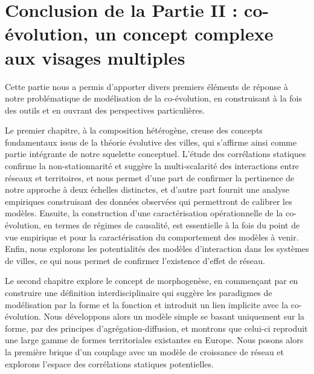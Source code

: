 



\chapter*{Conclusion de la Partie II : co-évolution, un concept complexe aux visages multiples}








Cette partie nous a permis d'apporter divers premiers éléments de réponse à notre problématique de modélisation de la co-évolution, en construisant à la fois des outils et en ouvrant des perspectives particulières. 


Le premier chapitre, à la composition hétérogène, creuse des concepts fondamentaux issus de la théorie évolutive des villes, qui s'affirme ainsi comme partie intégrante de notre squelette conceptuel. L'étude des corrélations statiques confirme la non-stationnarité et suggère la multi-scalarité des interactions entre réseaux et territoires, et nous permet d'une part de confirmer la pertinence de notre approche à deux échelles distinctes, et d'autre part fournit une analyse empiriques construisant des données observées qui permettront de calibrer les modèles. Ensuite, la construction d'une caractérisation opérationnelle de la co-évolution, en termes de régimes de causalité, est essentielle à la fois du point de vue empirique et pour la caractérisation du comportement des modèles à venir. Enfin, nous explorons les potentialités des modèles d'interaction dans les systèmes de villes, ce qui nous permet de confirmer l'existence d'effet de réseau.

Le second chapitre explore le concept de morphogenèse, en commençant par en construire une définition interdisciplinaire qui suggère les paradigmes de modélisation par la forme et la fonction et introduit un lien implicite avec la co-évolution. Nous développons alors un modèle simple se basant uniquement sur la forme, par des principes d'agrégation-diffusion, et montrons que celui-ci reproduit une large gamme de formes territoriales existantes en Europe. Nous posons alors la première brique d'un couplage avec un modèle de croissance de réseau et explorons l'espace des corrélations statiques potentielles.


